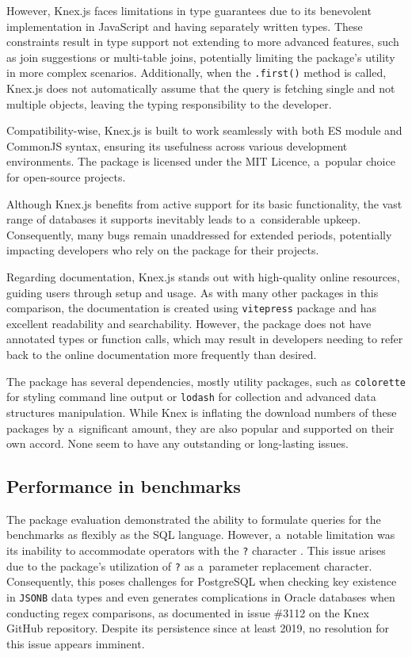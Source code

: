 However, Knex.js faces limitations in type guarantees due to its benevolent
implementation in JavaScript and having separately written types. These
constraints result in type support not extending to more advanced features, such
as join suggestions or multi-table joins, potentially limiting the package's
utility in more complex scenarios. Additionally, when the \texttt{.first()}
method is called, Knex.js does not automatically assume that the query is
fetching single and not multiple objects, leaving the typing responsibility to
the developer.

Compatibility-wise, Knex.js is built to work seamlessly with both ES module and
CommonJS syntax, ensuring its usefulness across various development
environments. The package is licensed under the MIT Licence, a~popular choice
for open-source projects.

Although Knex.js benefits from active support for its basic functionality, the
vast range of databases it supports inevitably leads to a~considerable upkeep.
Consequently, many bugs remain unaddressed for extended periods, potentially
impacting developers who rely on the package for their projects.

Regarding documentation, Knex.js stands out with high-quality online resources,
guiding users through setup and usage. As with many other packages in this
comparison, the documentation is created using \texttt{vitepress} package and
has excellent readability and searchability. However, the package does not have
annotated types or function calls, which may result in developers needing to
refer back to the online documentation more frequently than desired.

The package has several dependencies, mostly utility packages, such as
\texttt{colorette} for styling command line output or \texttt{lodash} for
collection and advanced data structures manipulation. While Knex is inflating
the download numbers of these packages by a~significant amount, they are also
popular and supported on their own accord. None seem to have any outstanding or
long-lasting issues.

\subsection*{Performance in benchmarks}

The package evaluation demonstrated the ability to formulate queries for the
benchmarks as flexibly as the SQL language. However, a~notable limitation was
its inability to accommodate operators with the \texttt{?} character
\cite{knexJSONIssue1}. This issue arises due to the package's utilization of
\texttt{?} as a~parameter replacement character. Consequently, this poses
challenges for PostgreSQL when checking key existence in \texttt{JSONB} data types and
even generates complications in Oracle databases when conducting regex
comparisons, as documented in issue \#3112 \cite{knexJSONIssue2} on the Knex
GitHub repository. Despite its persistence since at least 2019, no resolution
for this issue appears imminent.

